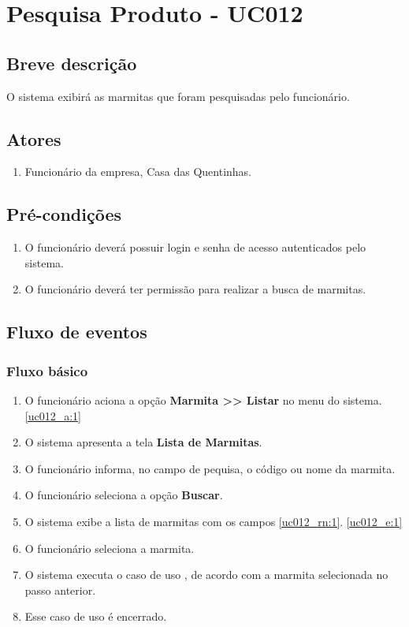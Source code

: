 \chapter{Pesquisa Produto - UC012} \label{uc012}

\section{Breve descrição}

O sistema exibirá as marmitas que foram pesquisadas pelo funcionário.

\section{Atores}

\begin{enumerate}
	\item Funcionário da empresa, Casa das Quentinhas.
\end{enumerate}

\section{Pré-condições}

\begin{enumerate}
	\item O funcionário deverá possuir login e senha de acesso autenticados pelo sistema.
	\item O funcionário deverá ter permissão para realizar a busca de marmitas.
\end{enumerate}

\section{Fluxo de eventos}

\subsection{Fluxo básico}

\begin{enumerate}[label=P\arabic*]
	\item O funcionário aciona a opção \textbf{Marmita >> Listar} no menu do sistema. \label{uc012_p:1}\ref{uc012_a:1}
	\item O sistema apresenta a tela \textbf{Lista de Marmitas}.	
	\item O funcionário informa, no campo de pequisa, o código ou nome da marmita. \label{uc012_p:3}
	\item O funcionário seleciona a opção \textbf{Buscar}.
	\item O sistema exibe a lista de marmitas com os campos \ref{uc012_rn:1}. \ref{uc012_e:1}
	\item O funcionário seleciona a marmita.
	\item O sistema executa o caso de uso , de acordo com a marmita selecionada no passo anterior.
	\item Esse caso de uso é encerrado.
\end{enumerate}

